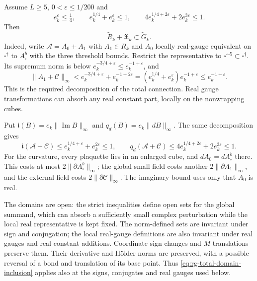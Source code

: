 \documentclass[11pt,letterpaper,reqno]{amsart}
\begin{document}
Assume $L\ge5$, $0<\varepsilon\le1/200$ and
\begin{equation}\label{eq:rg-domain-charge-conditions}
 e_k^\varepsilon\le\tfrac14,\qquad
 e_k^{1/4}+e_k^\varepsilon\le1,\qquad
 4e_k^{1/4+2\varepsilon}+2e_k^{3\varepsilon}\le1.
\end{equation}
Then
\begin{equation}\label{eq:rg-total-domain-inclusion}
 \widetilde R_k+\mathfrak X_k\subset\widetilde G_k.
\end{equation}
Indeed, write $\mathscr A=A_0+A_1$ with $A_1\in R_k$ and
$A_0$ locally real-gauge equivalent on $\square^\dagger$ to
$A_\square^b$ with the three threshold bounds. Restrict the
representative to $\square^{\sim5}\subset\square^\dagger$.
Its supremum norm is below
$e_k^{-3/4+\varepsilon}\le e_k^{-1+\varepsilon}$, and
\[
 \|A_1+\mathscr C\|_\infty
 <e_k^{-3/4+\varepsilon}+e_k^{-1+2\varepsilon}
 =(e_k^{1/4}+e_k^\varepsilon)e_k^{-1+\varepsilon}
 \le e_k^{-1+\varepsilon}.
\]
This is the required decomposition of the total connection.
Real gauge transformations can absorb any real constant part,
locally on the nonwrapping cubes.

Put $\mathfrak i(B)=e_k\|\operatorname{Im}B\|_\infty$ and
$q_d(B)=e_k\|dB\|_\infty$. The same decomposition gives
\begin{equation}\label{eq:rg-total-imaginary-curvature-bounds}
 \mathfrak i(\mathscr A+\mathscr C)
       \le e_k^{1/4+\varepsilon}+e_k^{2\varepsilon}\le1,
 \qquad
 q_d(\mathscr A+\mathscr C)
       \le4e_k^{1/4+2\varepsilon}+2e_k^{3\varepsilon}\le1.
\end{equation}
For the curvature, every plaquette lies in an enlarged cube,
and $dA_0=dA_\square^b$ there. This costs at most
$2\|\partial A_\square^b\|_\infty$; the global small field
costs another $2\|\partial A_1\|_\infty$, and the external
field costs $2\|\partial\mathscr C\|_\infty$.
The imaginary bound uses only that $A_0$ is real.

The domains are open: the strict inequalities define open
sets for the global summand, which can absorb a sufficiently
small complex perturbation while the local real representative
is kept fixed. The norm-defined sets are invariant under sign
and conjugation; the local real-gauge definitions are also
invariant under real gauges and real constant additions.
Coordinate sign changes and $M$ translations preserve them.
Their derivative and H\"older norms are preserved, with a
possible reversal of a bond and translation of its base point.
Thus \eqref{eq:rg-total-domain-inclusion} applies also at the
signs, conjugates and real gauges used below.
\end{document}
